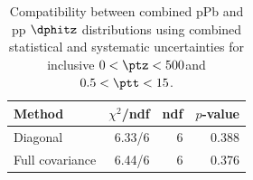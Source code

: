 \begin{table}[htp!]
\centering
\begin{tabular}{|l|r|r|r|}
\hline
Method & $\chi^2$/ndf & ndf & $p$-value \\
\hline
Diagonal & 6.33/6 & 6 & 0.388 \\
Full covariance & 6.44/6 & 6 & 0.376 \\
\hline
\end{tabular}
\caption{Compatibility between combined pPb and pp $\dphitz$ distributions using combined statistical and systematic uncertainties for inclusive $0 < \ptz < 500$\GeV and $0.5 < \ptt < 15$\GeV.}
\label{table:chisq_dphi}
\end{table}
